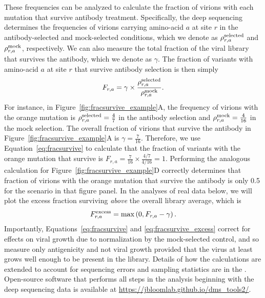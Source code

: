 \documentclass[11pt]{article}
\begin{document}
These frequencies can be analyzed to calculate the fraction of virions with each mutation that survive antibody treatment.
Specifically, the deep sequencing determines the frequencies of virions carrying amino-acid $a$ at site $r$ in the antibody-selected and mock-selected conditions, which we denote as $\rho_{r,a}^{\rm{selected}}$ and $\rho_{r,a}^{\rm{mock}}$, respectively.
We can also measure the total fraction of the viral library that survives the antibody, which we denote as $\gamma$.
The fraction of variants with amino-acid $a$ at site $r$ that survive antibody selection is then simply 
\begin{equation}
\label{eq:fracsurvive}
F_{r,a} = \gamma \times \frac{\rho_{r,a}^{\rm{selected}}}{\rho_{r,a}^{\rm{mock}}}.
\end{equation}
For instance, in Figure~\ref{fig:fracsurvive_example}A, the frequency of virions with the orange mutation is $\rho_{r,a}^{\rm{selected}} = \frac{4}{7}$ in the antibody selection and $\rho_{r,a}^{\rm{mock}} = \frac{4}{16}$ in the mock selection.
The overall fraction of virions that survive the antibody in Figure~\ref{fig:fracsurvive_example}A is $\gamma = \frac{7}{16}$.
Therefore, we use Equation~\ref{eq:fracsurvive} to calculate that the fraction of variants with the orange mutation that survive is $F_{r,a} = \frac{7}{16} \times \frac{4/7}{4/16} = 1$.
Performing the analogous calculation for Figure~\ref{fig:fracsurvive_example}D correctly determines that fraction of virions with the orange mutation that survive the antibody is only 0.5 for the scenario in that figure panel.
In the analyses of real data below, we will plot the excess fraction surviving \emph{above} the overall library average, which is
\begin{equation}
\label{eq:fracsurvive_excess}
F_{r,a}^{\rm{excess}} = \max\left(0, F_{r,a} - \gamma\right).
\end{equation}
Importantly, Equations~\ref{eq:fracsurvive} and \ref{eq:fracsurvive_excess} correct for effects on viral growth due to normalization by the mock-selected control, and so measure only antigenicity and not viral growth provided that the virus at least grows well enough to be present in the library.
Details of how the calculations are extended to account for sequencing errors and sampling statistics are in the .
Open-source software that performs all steps in the analysis beginning with the deep sequencing data is available at \url{https://jbloomlab.github.io/dms_tools2/}.
\end{document}
